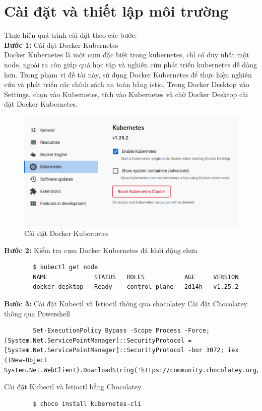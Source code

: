 \documentclass[12pt,a4paper]{report}
\begin{document}
{{	\section{Cài đặt và thiết lập môi trường}
	Thực hiện quá trình cài đặt theo các bước:\\
	\textbf{Bước 1:} Cài đặt Docker Kubernetes\\
	Docker Kubernetes là một cụm đặc biệt trong kubernetes, chỉ có duy nhất một node, ngoài ra còn giúp quá học tập và nghiên cứu phát triển kubernetes dễ dàng hơn. Trong phạm vi đề tài này, sử dụng Docker Kubernetes để thực hiện nghiên cứu và phát triển các chính sách an toàn bằng istio. Trong Docker Desktop vào Settings, chọn vào Kubernetes, tích vào Kubernetes và chờ Docker Desktop  cài đặt Docker Kubernetes.
	
	\begin{figure}[h!]
		\centering
		\includegraphics[width=0.65\linewidth]{Pics/3.2-1}
		\caption{Cài đặt Docker Kubernetes}
		\label{fig:3.2-1}
	\end{figure}
	
	\textbf{Bước 2:} Kiểm tra cụm Docker Kubernetes đã khởi động chưa
	\begin{lstlisting}
		$ kubectl get node
		NAME             STATUS   ROLES           AGE     VERSION
		docker-desktop   Ready    control-plane   2d14h   v1.25.2
	\end{lstlisting}
	\textbf{Bước 3:} Cài đặt Kubectl và Istioctl thông qua chocolatey
	Cài đặt Chocolatey thông qua Powershell
	\begin{lstlisting}
		Set-ExecutionPolicy Bypass -Scope Process -Force; [System.Net.ServicePointManager]::SecurityProtocol = [System.Net.ServicePointManager]::SecurityProtocol -bor 3072; iex ((New-Object System.Net.WebClient).DownloadString('https://community.chocolatey.org/install.ps1'))
	\end{lstlisting}
	
	Cài đặt Kubectl và Istioctl bằng Chocolatey
	\begin{lstlisting}
		$ choco install kubernetes-cli
		

\end{lstlisting}}}
\end{document}
